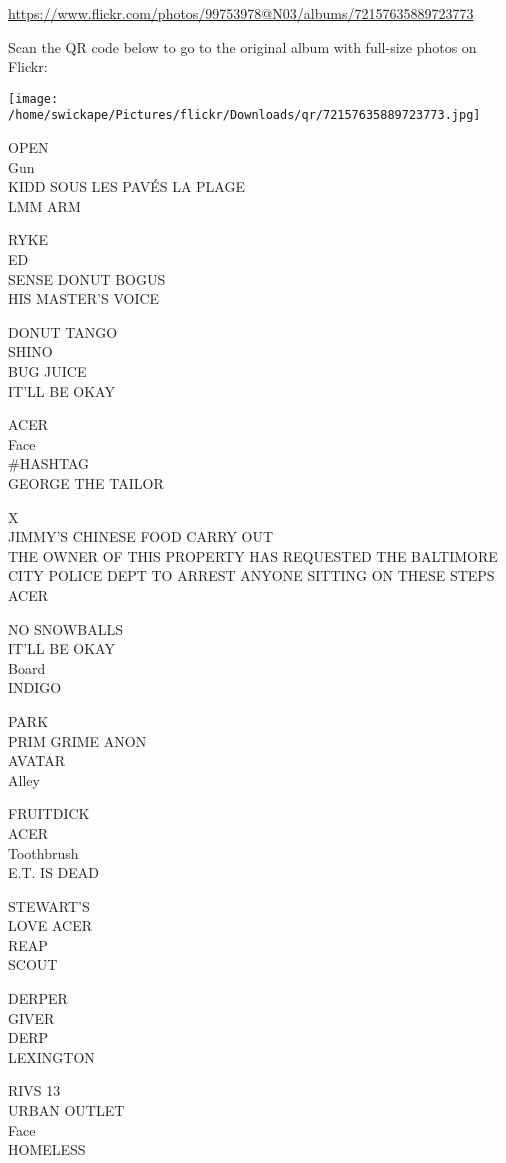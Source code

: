 \documentclass[10pt,letterpaper]{article}
\begin{document}
\url{https://www.flickr.com/photos/99753978@N03/albums/72157635889723773}

Scan the QR code below to go to the original album with full-size photos on Flickr:

\texttt{[image: /home/swickape/Pictures/flickr/Downloads/qr/72157635889723773.jpg]}


OPEN\\
Gun\\
KIDD SOUS LES PAVÉS LA PLAGE\\
LMM ARM

RYKE\\
ED\\
SENSE DONUT BOGUS\\
HIS MASTER'S VOICE

DONUT TANGO\\
SHINO\\
BUG JUICE\\
IT'LL BE OKAY

ACER\\
Face\\
\#HASHTAG\\
GEORGE THE TAILOR

X\\
JIMMY'S CHINESE FOOD CARRY OUT\\
THE OWNER OF THIS PROPERTY HAS REQUESTED THE BALTIMORE CITY POLICE DEPT TO ARREST ANYONE SITTING ON THESE STEPS\\
ACER

NO SNOWBALLS\\
IT'LL BE OKAY\\
Board\\
INDIGO

PARK\\
PRIM GRIME ANON\\
AVATAR\\
Alley

FRUITDICK\\
ACER\\
Toothbrush\\
E.T. IS DEAD

STEWART'S\\
LOVE ACER\\
REAP\\
SCOUT

DERPER\\
GIVER\\
DERP\\
LEXINGTON

RIVS 13\\
URBAN OUTLET\\
Face\\
HOMELESS
\end{document}

